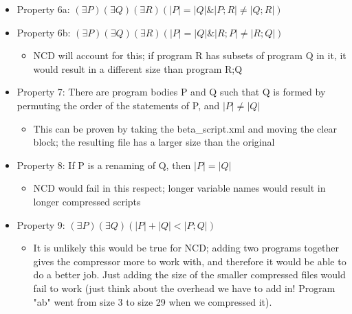 \documentclass[]{article}
\begin{document}
\begin{itemize}
\begin{itemize}
	\end{itemize}
	\item Property 6a: $(\exists P)(\exists Q)(\exists R)(|P| = |Q| \& |P;R| \neq |Q; R|)$
	\item Property 6b: $(\exists P)(\exists Q)(\exists R)(|P| = |Q| \& |R;P| \neq |R; Q|)$
	\begin{itemize}
		\item NCD will account for this; if program R has subsets of program Q in it, it would result in a different size than program R;Q
	\end{itemize}
	\item Property 7: There are program bodies P and Q such that Q is formed by permuting the order of the statements of P, and $|P| \neq |Q|$
	\begin{itemize}
		\item This can be proven by taking the beta\_script.xml and moving the clear block; the resulting file has a larger size than the original
	\end{itemize}
	\item Property 8: If P is a renaming of Q, then $|P| = |Q|$
	\begin{itemize}
		\item NCD would fail in this respect; longer variable names would result in longer compressed scripts
	\end{itemize}
	\item Property 9: $(\exists P)(\exists Q)(|P|+|Q| < |P; Q|)$
	\begin{itemize}
		\item It is unlikely this would be true for NCD; adding two programs together gives the compressor more to work with, and therefore it would be able to do a better job. Just adding the size of the smaller compressed files would fail to work (just think about the overhead we have to add in! Program "ab" went from size 3 to size 29 when we compressed it).
	\end{itemize}
\end{itemize}


\end{document}
